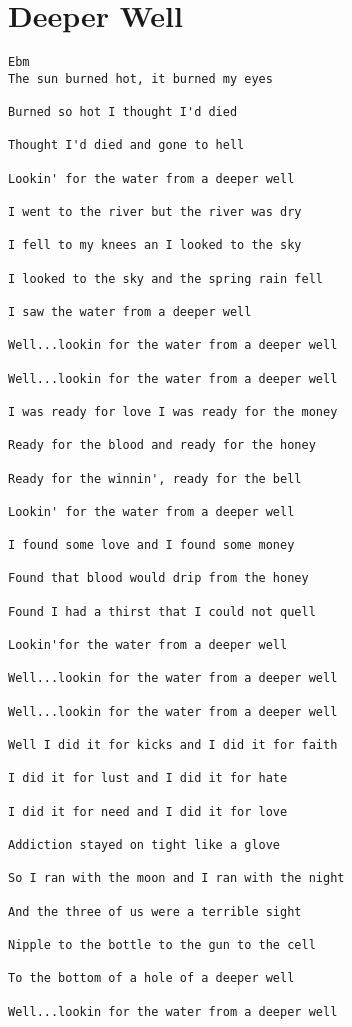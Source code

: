 \documentclass[leqno]{memoir}
\begin{document}
\chapter{Deeper Well}
\begin{verbatim}
Ebm
The sun burned hot, it burned my eyes 

Burned so hot I thought I'd died 

Thought I'd died and gone to hell 

Lookin' for the water from a deeper well 

I went to the river but the river was dry 

I fell to my knees an I looked to the sky 

I looked to the sky and the spring rain fell 

I saw the water from a deeper well 

Well...lookin for the water from a deeper well

Well...lookin for the water from a deeper well 

I was ready for love I was ready for the money 

Ready for the blood and ready for the honey 

Ready for the winnin', ready for the bell 

Lookin' for the water from a deeper well

I found some love and I found some money 

Found that blood would drip from the honey 

Found I had a thirst that I could not quell 

Lookin'for the water from a deeper well 

Well...lookin for the water from a deeper well 

Well...lookin for the water from a deeper well 

Well I did it for kicks and I did it for faith 

I did it for lust and I did it for hate 

I did it for need and I did it for love 

Addiction stayed on tight like a glove 

So I ran with the moon and I ran with the night 

And the three of us were a terrible sight 

Nipple to the bottle to the gun to the cell 

To the bottom of a hole of a deeper well

Well...lookin for the water from a deeper well 


\end{verbatim}
\end{document}
